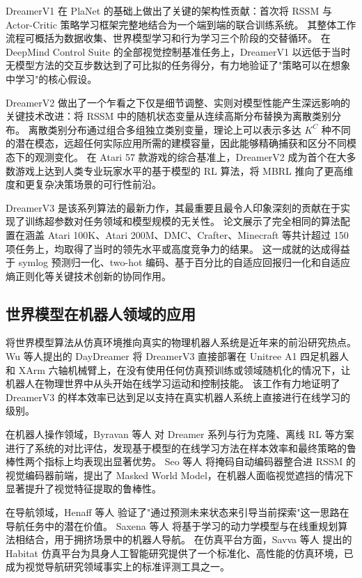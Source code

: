 \documentclass[12pt,a4paper]{ctexart}
\begin{document}
DreamerV1\cite{hafner2020dreamer} 在 PlaNet 的基础上做出了关键的架构性贡献：首次将 RSSM 与 Actor-Critic 策略学习框架完整地结合为一个端到端的联合训练系统。
其整体工作流程可概括为数据收集、世界模型学习和行为学习三个阶段的交替循环。
在 DeepMind Control Suite 的全部视觉控制基准任务上，DreamerV1 以远低于当时无模型方法的交互步数达到了可比拟的任务得分，有力地验证了"策略可以在想象中学习"的核心假设。

DreamerV2\cite{hafner2021mastering} 做出了一个乍看之下仅是细节调整、实则对模型性能产生深远影响的关键技术改进：将 RSSM 中的随机状态变量从连续高斯分布替换为离散类别分布。
离散类别分布通过组合多组独立类别变量，理论上可以表示多达 $K^C$ 种不同的潜在模态，远超任何实际应用所需的建模容量，因此能够精确捕获和区分不同模态下的观测变化。
在 Atari 57 款游戏的综合基准上，DreamerV2 成为首个在大多数游戏上达到人类专业玩家水平的基于模型的 RL 算法，将 MBRL 推向了更高维度和更复杂决策场景的可行性前沿。

DreamerV3\cite{hafner2023mastering} 是该系列算法的最新力作，其最重要且最令人印象深刻的贡献在于实现了训练超参数对任务领域和模型规模的无关性。
论文展示了完全相同的算法配置在涵盖 Atari 100K、Atari 200M、DMC、Crafter、Minecraft 等共计超过 150 项任务上，均取得了当时的领先水平或高度竞争力的结果。
这一成就的达成得益于 symlog 预测归一化、two-hot 编码、基于百分比的自适应回报归一化和自适应熵正则化等关键技术创新的协同作用。

\subsection{世界模型在机器人领域的应用}

将世界模型算法从仿真环境推向真实的物理机器人系统是近年来的前沿研究热点。
Wu 等人提出的 DayDreamer\cite{wu2023daydreamer} 将 DreamerV3 直接部署在 Unitree A1 四足机器人和 XArm 六轴机械臂上，在没有使用任何仿真预训练或领域随机化的情况下，让机器人在物理世界中从头开始在线学习运动和控制技能。
该工作有力地证明了 DreamerV3 的样本效率已达到足以支持在真实机器人系统上直接进行在线学习的级别。

在机器人操作领域，Byravan 等人\cite{byravan2023evaluating} 对 Dreamer 系列与行为克隆、离线 RL 等方案进行了系统的对比评估，发现基于模型的在线学习方法在样本效率和最终策略的鲁棒性两个指标上均表现出显著优势。
Seo 等人\cite{seo2022masked} 将掩码自动编码器整合进 RSSM 的视觉编码器前端，提出了 Masked World Model，在机器人面临视觉遮挡的情况下显著提升了视觉特征提取的鲁棒性。

在导航领域，Henaff 等人\cite{henaff2019model} 验证了"通过预测未来状态来引导当前探索"这一思路在导航任务中的潜在价值。
Saxena 等人\cite{saxena2019learning} 将基于学习的动力学模型与在线重规划算法相结合，用于拥挤场景中的机器人导航。
在仿真平台方面，Savva 等人\cite{savva2019habitat} 提出的 Habitat 仿真平台为具身人工智能研究提供了一个标准化、高性能的仿真环境，已成为视觉导航研究领域事实上的标准评测工具之一。
\end{document}

